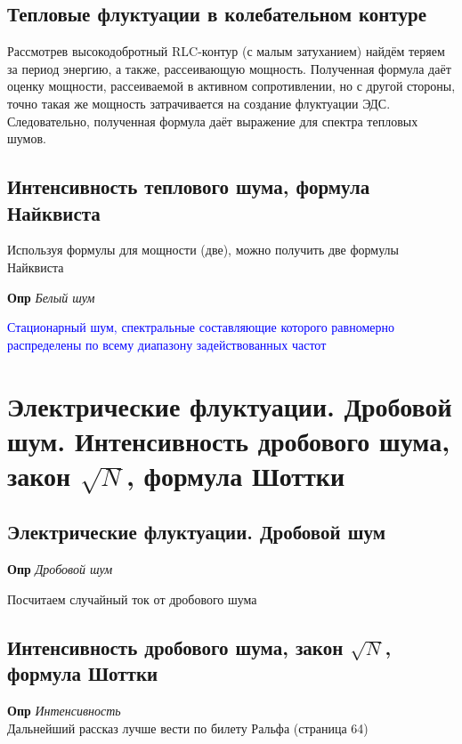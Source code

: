 \documentclass[a4paper, 14pt]{article}
\begin{document}
    \subsection{Тепловые флуктуации в колебательном контуре}
    
    Рассмотрев высокодобротный RLC-контур (с малым затуханием) найдём теряем за период энергию, а также, рассеивающую
    мощность.
    Полученная формула даёт оценку мощности, рассеиваемой в активном сопротивлении, но с другой стороны, точно такая
    же мощность затрачивается на создание флуктуации ЭДС.
    Следовательно, полученная формула даёт выражение для спектра тепловых шумов.
    
    \subsection{Интенсивность теплового шума, формула Найквиста}
    
    Используя формулы для мощности (две), можно получить две формулы Найквиста
    
    \textbf{Опр} \textit{Белый шум}
    
    \textcolor{blue}{Стационарный шум, спектральные составляющие которого равномерно распределены по всему диапазону
    задействованных частот}
    
    \section{Электрические флуктуации. Дробовой шум.
    Интенсивность дробового шума, закон $\sqrt{N}$, формула Шоттки}
    
    \subsection{Электрические флуктуации. Дробовой шум}
    
    \textbf{Опр} \textit{Дробовой шум}
    
    Посчитаем случайный ток от дробового шума
    
    \subsection{Интенсивность дробового шума, закон $\sqrt{N}$, формула Шоттки}
    
    \textbf{Опр} \textit{Интенсивность} \\
    
    Дальнейший рассказ лучше вести по билету Ральфа (страница 64) \\
    
\end{document}
